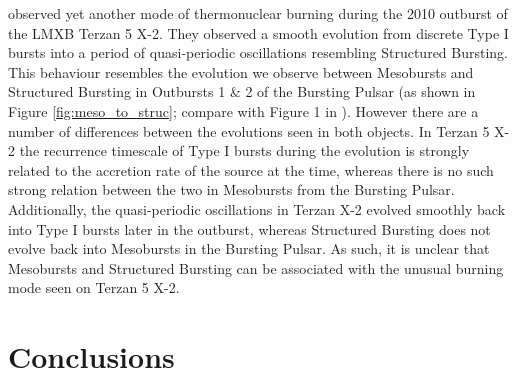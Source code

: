 \par \citet{Linares_MargStab} observed yet another mode of thermonuclear burning during the 2010 outburst of the LMXB Terzan 5 X-2.  They observed a smooth evolution from discrete Type I bursts into a period of quasi-periodic oscillations resembling Structured Bursting.  This behaviour resembles the evolution we observe between Mesobursts and Structured Bursting in Outbursts 1 \& 2 of the Bursting Pulsar (as shown in Figure \ref{fig:meso_to_struc}; compare with Figure 1 in \citealp{Linares_MargStab}).  However there are a number of differences between the evolutions seen in both objects.  In Terzan 5 X-2 the recurrence timescale of Type I bursts during the evolution is strongly related to the accretion rate of the source at the time, whereas there is no such strong relation between the two in Mesobursts from the Bursting Pulsar.  Additionally, the quasi-periodic oscillations in Terzan X-2 evolved smoothly back into Type I bursts later in the outburst, whereas Structured Bursting does not evolve back into Mesobursts in the Bursting Pulsar.  As such, it is unclear that Mesobursts and Structured Bursting can be associated with the unusual burning mode seen on Terzan 5 X-2.

\section{Conclusions}

